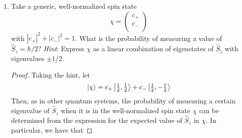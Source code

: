 \documentclass[../psets.tex]{subfiles}
\begin{document}
\begin{enumerate}
\begin{enumerate}
\begin{proof}
\begin{equation*}
                = 0
            \end{equation*}
            Similarly, it is a theorem of linear algebra that the product of the eigenvalues equals the determinant. Hence, property (iii) tells us that
            \begin{equation*}
                \lambda_1\lambda_2 = {\det}(\hat{S}_x)
                = {\det}(\hat{S}_y)
                = -\frac{\hbar^2}{4}
            \end{equation*}
            Lastly, it is a theorem of linear algebra that Hermitian matrices have real eigenvalues. Thus, property (iii) tells us that we can solve the two-equation, two-variable system
            \begin{equation*}
                \begin{cases}
                    \lambda_1+\lambda_2 = 0\\
                    \lambda_1\lambda_2 = -\frac{\hbar^2}{4}
                \end{cases}
            \end{equation*}
            over the real numbers $\R$ to obtain, WLOG, that
            \begin{align*}
                \lambda_1 &= \frac{\hbar}{2}&
                \lambda_2 &= -\frac{\hbar}{2}
            \end{align*}
            This provides the desired verification.
        \end{proof}
        \pagebreak
        \item Take a generic, well-normalized spin state
        \begin{equation}
            \chi =
            \begin{pmatrix}
                c_+\\
                c_-\\
            \end{pmatrix}
        \end{equation}
        with $|c_+|^2+|c_-|^2=1$. What is the probability of measuring a value of $\hat{S}_z=\hbar/2$? \emph{Hint}: Express $\chi$ as a linear combination of eigenstates of $\hat{S}_z$ with eigenvalues $\pm 1/2$.
        \begin{proof}
            Taking the hint, let
            \begin{equation*}
                \ket{\chi} = c_+\ket{\tfrac{1}{2},\tfrac{1}{2}}+c_-\ket{\tfrac{1}{2},-\tfrac{1}{2}}
            \end{equation*}
            Then, as in other quantum systems, the probability of measuring a certain eigenvalue of $\hat{S}_z$ when it is in the well-normalized spin state $\chi$ can be determined from the expression for the expected value of $\hat{S}_z$ in $\chi$. In particular, we have that

\end{proof}
\end{enumerate}
\end{enumerate}
\end{document}
